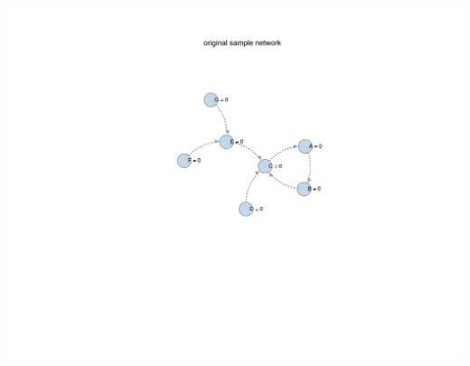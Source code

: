 \documentclass[a4paper, 12pt]{article}
\begin{document}
\includegraphics[width=\textwidth]{traversal_algo_org_net.pdf}    
\newpage
\end{document}
